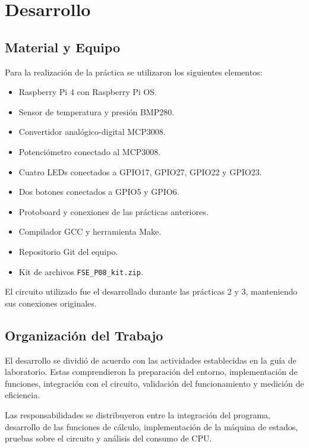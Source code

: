 \documentclass[conference]{IEEEtran}
\begin{document}

\section{Desarrollo}

\subsection{Material y Equipo}

Para la realización de la práctica se utilizaron los siguientes elementos:

\begin{itemize}
    \item Raspberry Pi 4 con Raspberry Pi OS.
    \item Sensor de temperatura y presión BMP280.
    \item Convertidor analógico-digital MCP3008.
    \item Potenciómetro conectado al MCP3008.
    \item Cuatro LEDs conectados a GPIO17, GPIO27, GPIO22 y GPIO23.
    \item Dos botones conectados a GPIO5 y GPIO6.
    \item Protoboard y conexiones de las prácticas anteriores.
    \item Compilador GCC y herramienta Make.
    \item Repositorio Git del equipo.
    \item Kit de archivos \texttt{FSE\_P08\_kit.zip}.
\end{itemize}

El circuito utilizado fue el desarrollado durante las prácticas 2 y 3, manteniendo sus conexiones originales.

\subsection{Organización del Trabajo}

El desarrollo se dividió de acuerdo con las actividades establecidas en la guía de laboratorio. Estas comprendieron la preparación del entorno, implementación de funciones, integración con el circuito, validación del funcionamiento y medición de eficiencia.

Las responsabilidades se distribuyeron entre la integración del programa, desarrollo de las funciones de cálculo, implementación de la máquina de estados, pruebas sobre el circuito y análisis del consumo de CPU.
\end{document}
